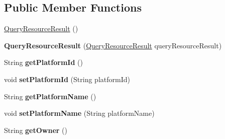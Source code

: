 \subsection*{Public Member Functions}
\begin{DoxyCompactItemize}
\item 
\hyperlink{classeu_1_1h2020_1_1symbiote_1_1core_1_1ci_1_1QueryResourceResult_a411d2e98b86a317baf2b1c256ea9a7c9}{Query\+Resource\+Result} ()
\item 
\mbox{\label{classeu_1_1h2020_1_1symbiote_1_1core_1_1ci_1_1QueryResourceResult_a562de100329259e458c2c479ea07fe55}} 
{\bfseries Query\+Resource\+Result} (\hyperlink{classeu_1_1h2020_1_1symbiote_1_1core_1_1ci_1_1QueryResourceResult}{Query\+Resource\+Result} query\+Resource\+Result)
\item 
\mbox{\label{classeu_1_1h2020_1_1symbiote_1_1core_1_1ci_1_1QueryResourceResult_a760bbda4e31a80d6cdc881a15deb14c1}} 
String {\bfseries get\+Platform\+Id} ()
\item 
\mbox{\label{classeu_1_1h2020_1_1symbiote_1_1core_1_1ci_1_1QueryResourceResult_a53a6b07183e99b89506e4a0ceae7bb3f}} 
void {\bfseries set\+Platform\+Id} (String platform\+Id)
\item 
\mbox{\label{classeu_1_1h2020_1_1symbiote_1_1core_1_1ci_1_1QueryResourceResult_a4f41f8206789f3afbb139d68f11b8a87}} 
String {\bfseries get\+Platform\+Name} ()
\item 
\mbox{\label{classeu_1_1h2020_1_1symbiote_1_1core_1_1ci_1_1QueryResourceResult_ae5f04bcbf75426939306ead984fb7e77}} 
void {\bfseries set\+Platform\+Name} (String platform\+Name)
\item 
\mbox{\label{classeu_1_1h2020_1_1symbiote_1_1core_1_1ci_1_1QueryResourceResult_a4c591a51127450cc73751984b30c401c}} 
String {\bfseries get\+Owner} ()
\item 
\mbox{\label{classeu_1_1h2020_1_1symbiote_1_1core_1_1ci_1_1QueryResourceResult_a388dcf9a8880ca25a895680012f506e4}} 

\end{DoxyCompactItemize}
